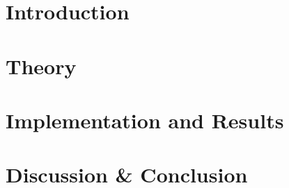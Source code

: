 \documentclass[11pt]{report}
\begin{document}



\pagebreak

\tableofcontents
\pagebreak


\chapter{Introduction}


\chapter{Theory}


\chapter{Implementation and Results}\label{implementation}


\chapter{Discussion \& Conclusion}














\pagebreak
\printbibliography[heading=bibintoc, title={Bibliography}]
\pagebreak



\end{document}
